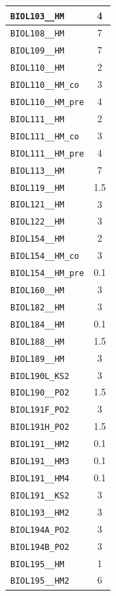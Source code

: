 \begin{longtable}{|p{}|c|}
    \verb|BIOL103__HM| & 4\\\hline
    \verb|BIOL108__HM| & 7\\\hline
    \verb|BIOL109__HM| & 7\\\hline
    \verb|BIOL110__HM| & 2\\\hline
    \verb|BIOL110__HM_co| & 3\\\hline
    \verb|BIOL110__HM_pre| & 4\\\hline
    \verb|BIOL111__HM| & 2\\\hline
    \verb|BIOL111__HM_co| & 3\\\hline
    \verb|BIOL111__HM_pre| & 4\\\hline
    \verb|BIOL113__HM| & 7\\\hline
    \verb|BIOL119__HM| & 1.5\\\hline
    \verb|BIOL121__HM| & 3\\\hline
    \verb|BIOL122__HM| & 3\\\hline
    \verb|BIOL154__HM| & 2\\\hline
    \verb|BIOL154__HM_co| & 3\\\hline
    \verb|BIOL154__HM_pre| & 0.1\\\hline
    \verb|BIOL160__HM| & 3\\\hline
    \verb|BIOL182__HM| & 3\\\hline
    \verb|BIOL184__HM| & 0.1\\\hline
    \verb|BIOL188__HM| & 1.5\\\hline
    \verb|BIOL189__HM| & 3\\\hline
    \verb|BIOL190L_KS2| & 3\\\hline
    \verb|BIOL190__PO2| & 1.5\\\hline
    \verb|BIOL191F_PO2| & 3\\\hline
    \verb|BIOL191H_PO2| & 1.5\\\hline
    \verb|BIOL191__HM2| & 0.1\\\hline
    \verb|BIOL191__HM3| & 0.1\\\hline
    \verb|BIOL191__HM4| & 0.1\\\hline
    \verb|BIOL191__KS2| & 3\\\hline
    \verb|BIOL193__HM2| & 3\\\hline
    \verb|BIOL194A_PO2| & 3\\\hline
    \verb|BIOL194B_PO2| & 3\\\hline
    \verb|BIOL195__HM| & 1\\\hline
    \verb|BIOL195__HM2| & 6\\\hline

\end{longtable}
